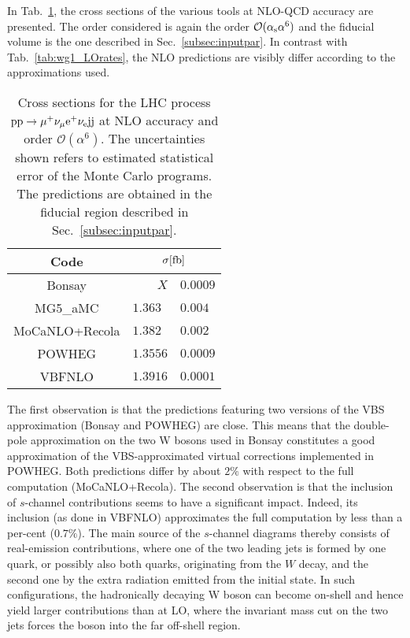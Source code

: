 In Tab.~\ref{tab:wg1_NLOrates}, the cross sections of the various tools at NLO-QCD accuracy are presented.
The order considered is again the order $\mathcal{O}(\alpha_{\rm s}\alpha^6)$ and the fiducial volume is the one described in Sec.~\ref{subsec:inputpar}.
In contrast with Tab.~\ref{tab:wg1_LOrates}, the NLO predictions are visibly differ according to the approximations used.

\begin{table}[h!]
    \centering
    \begin{tabular}{c|r@{ $\pm$ }l}
      Code  &  \multicolumn{2}{c}{$\sigma[\rm{fb}]$}  \\
        \hline
        \hline
        {\sc Bonsay}  &  $X$ & $0.0009$  \\
        {\sc MG5\_aMC}&  $1.363\phantom{0}$ & $0.004$  \\
        {\sc MoCaNLO+Recola}  &  $ 1.382\phantom{0}$ & $0.002$ \\
        {\sc POWHEG}  &  $1.3556$ & $0.0009$  \\
        {\sc VBFNLO}  &  $1.3916$ & $0.0001$  \\
    \end{tabular}
    \caption{\label{tab:wg1_NLOrates} Cross sections for the LHC process ${\rm p}{\rm p}\to\mu^+\nu_\mu{\rm e}^+\nu_{\rm e}{\rm j}{\rm j}$ at NLO accuracy and order $\mathcal{O}(\alpha^6)$.
    The uncertainties shown refers to estimated statistical error of the Monte Carlo programs.
    The predictions are obtained in the fiducial region described in Sec.~\ref{subsec:inputpar}.
    }
\end{table}

The first observation is that the predictions featuring two versions of the VBS approximation ({\sc Bonsay} and {\sc POWHEG}) are close.
This means that the double-pole approximation on the two W bosons used in {\sc Bonsay} constitutes a good approximation of the VBS-approximated virtual corrections implemented in {\sc POWHEG}.
Both predictions differ by about $2\%$ with respect to the full computation ({\sc MoCaNLO+Recola}).
The second observation is that the inclusion of $s$-channel contributions seems to have a significant impact.
Indeed, its inclusion (as done in {\sc VBFNLO}) approximates the full computation by less than a per-cent ($0.7\%$).
The main source of the $s$-channel diagrams thereby consists of
real-emission contributions, where one of the two leading jets is formed
by one quark, or possibly also both quarks, originating from the $W$
decay, and the second one by the extra radiation emitted from the
initial state. In such configurations, the hadronically decaying W boson
can become on-shell and hence yield larger contributions than at LO, where the
invariant mass cut on the two jets forces the boson into the far
off-shell region.
